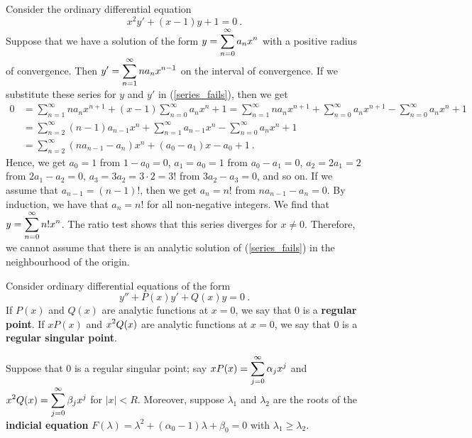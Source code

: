 \begin{egg}
Consider the ordinary differential equation
\begin{equation}\label{series_fails}
x^2 y' + (x-1)y + 1 = 0 \ .
\end{equation}
Suppose that we have a solution of the form
$\displaystyle y = \sum_{n=0}^\infty a_n x^n$ with a positive radius
of convergence.  Then
$\displaystyle y' = \sum_{n=1}^\infty n a_n x^{n-1}$ on the interval
of convergence.  If we substitute these series for $y$ and $y'$ in
(\ref{series_fails}), then we get
\begin{align*}
0 &= \sum_{n=1}^\infty n a_n x^{n+1} +(x-1) \sum_{n=0}^\infty a_n x^n + 1
= \sum_{n=1}^\infty n a_n x^{n+1} + \sum_{n=0}^\infty a_n x^{n+1} -
\sum_{n=0}^\infty a_n x^n + 1 \\
&= \sum_{n=2}^\infty (n-1) a_{n-1} x^n + \sum_{n=1}^\infty a_{n-1} x^n -
\sum_{n=0}^\infty a_n x^n + 1 \\
&= \sum_{n=2}^\infty \left( n a_{n-1} - a_n\right) x^n
+ (a_0 - a_1)x - a_0 + 1 \ .
\end{align*}
Hence, we get $a_0 = 1$ from $1-a_0 = 0$,
$a_1 = a_0 = 1$ from $a_0 - a_1 = 0$,
$a_2 = 2a_1 = 2$ from $2 a_1 - a_2 = 0$,
$a_3 = 3a_2 = 3\cdot 2 = 3!$ from $3 a_2 - a_3 = 0$, and so on.
If we assume that $a_{n-1} = (n-1)!$, then we get $a_n = n!$ from
$n a_{n-1} - a_n = 0$.  By induction, we have that $a_n = n!$ for all
non-negative integers.  We find that
$\displaystyle y = \sum_{n=0}^\infty n! x^n$.  The ratio test
shows that this series diverges for $x\neq 0$.  Therefore, we cannot
assume that there is an analytic solution of (\ref{series_fails}) in
the neighbourhood of the origin.
\end{egg}

Consider ordinary differential equations of the form
\begin{equation} \label{spv_frobenius}
y'' + P(x) y' + Q(x) y = 0 \ .
\end{equation}
If $P(x)$ and $Q(x)$ are analytic functions at $x=0$, we say that
$0$ is a {\bfseries regular point}.
If $x P(x)$ and $\displaystyle x^2 Q(x)$ are analytic functions at
$x=0$, we say that $0$ is a
{\bfseries regular singular point}.

Suppose that $0$ is a regular singular point; say
$\displaystyle x P(x) = \sum_{j=0}^\infty \alpha_j x^j$ and
$\displaystyle x^2 Q(x) = \sum_{j=0}^\infty \beta_j x^j$ for $|x| < R$.
Moreover, suppose $\lambda_1$ and $\lambda_2$ are the roots of the
{\bfseries indicial equation}
$F(\lambda) = \lambda^2 + (\alpha_0 - 1) \lambda + \beta_0 = 0$
with $\lambda_1 \geq \lambda_2$.

